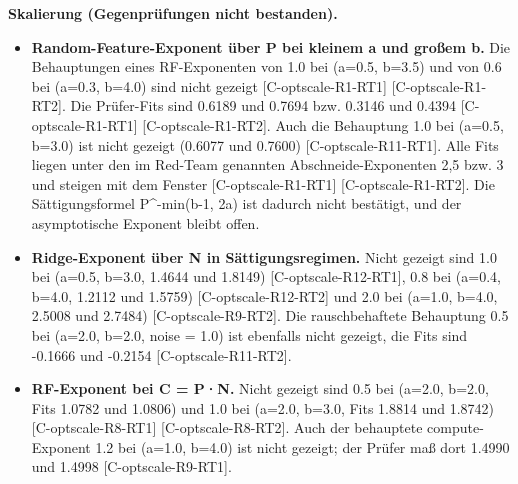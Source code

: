 \documentclass[10pt,twocolumn]{article}
\begin{document}
\textbf{Skalierung (Gegenprüfungen nicht bestanden).}
\begin{itemize}
\item \textbf{Random-Feature-Exponent über P bei kleinem a und großem b.} Die Behauptungen eines RF-Exponenten von 1.0 bei (a=0.5, b=3.5) und von 0.6 bei (a=0.3, b=4.0) sind nicht gezeigt {\scriptsize[C-optscale-R1-RT1]} {\scriptsize[C-optscale-R1-RT2]}. Die Prüfer-Fits sind 0.6189 und 0.7694 bzw. 0.3146 und 0.4394 {\scriptsize[C-optscale-R1-RT1]} {\scriptsize[C-optscale-R1-RT2]}. Auch die Behauptung 1.0 bei (a=0.5, b=3.0) ist nicht gezeigt (0.6077 und 0.7600) {\scriptsize[C-optscale-R11-RT1]}. Alle Fits liegen unter den im Red-Team genannten Abschneide-Exponenten 2,5 bzw. 3 und steigen mit dem Fenster {\scriptsize[C-optscale-R1-RT1]} {\scriptsize[C-optscale-R1-RT2]}. Die Sättigungsformel P^-min(b-1, 2a) ist dadurch nicht bestätigt, und der asymptotische Exponent bleibt offen.
\item \textbf{Ridge-Exponent über N in Sättigungsregimen.} Nicht gezeigt sind 1.0 bei (a=0.5, b=3.0, 1.4644 und 1.8149) {\scriptsize[C-optscale-R12-RT1]}, 0.8 bei (a=0.4, b=4.0, 1.2112 und 1.5759) {\scriptsize[C-optscale-R12-RT2]} und 2.0 bei (a=1.0, b=4.0, 2.5008 und 2.7484) {\scriptsize[C-optscale-R9-RT2]}. Die rauschbehaftete Behauptung 0.5 bei (a=2.0, b=2.0, noise = 1.0) ist ebenfalls nicht gezeigt, die Fits sind -0.1666 und -0.2154 {\scriptsize[C-optscale-R11-RT2]}.
\item \textbf{RF-Exponent bei C = P·N.} Nicht gezeigt sind 0.5 bei (a=2.0, b=2.0, Fits 1.0782 und 1.0806) und 1.0 bei (a=2.0, b=3.0, Fits 1.8814 und 1.8742) {\scriptsize[C-optscale-R8-RT1]} {\scriptsize[C-optscale-R8-RT2]}. Auch der behauptete compute-Exponent 1.2 bei (a=1.0, b=4.0) ist nicht gezeigt; der Prüfer maß dort 1.4990 und 1.4998 {\scriptsize[C-optscale-R9-RT1]}.
\end{itemize}
\end{document}
